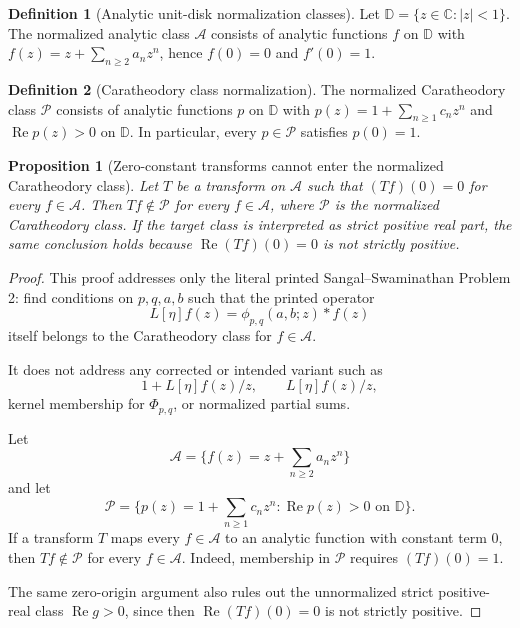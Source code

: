 \documentclass[11pt]{article}
\numberwithin{equation}{section}
\newtheorem{proposition}[theorem]{Proposition}
\theoremstyle{definition}
\newtheorem{definition}{Definition}[section]
\theoremstyle{remark}
\newcommand{\1}{\mathbf 1}
\begin{document}
\begin{definition}[Analytic unit-disk normalization classes]
\label{res:analytic-unit-disk-classes}
Let \(\mathbb D=\{z\in\mathbb C:|z|<1\}\). The normalized analytic class \(\mathcal A\) consists of analytic functions \(f\) on \(\mathbb D\) with \(f(z)=z+\sum_{n\ge2}a_nz^n\), hence \(f(0)=0\) and \(f'(0)=1\).
\end{definition}

\begin{definition}[Caratheodory class normalization]
\label{res:caratheodory-class-normalization}
The normalized Caratheodory class \(\mathcal P\) consists of analytic functions \(p\) on \(\mathbb D\) with \(p(z)=1+\sum_{n\ge1}c_nz^n\) and \(\operatorname{Re}p(z)>0\) on \(\mathbb D\). In particular, every \(p\in\mathcal P\) satisfies \(p(0)=1\).
\end{definition}

\begin{proposition}[Zero-constant transforms cannot enter the normalized Caratheodory class]
\label{res:zeroconstant-transform-not-caratheodory}
Let \(T\) be a transform on \(\mathcal A\) such that \((Tf)(0)=0\) for every \(f\in\mathcal A\). Then \(Tf\notin\mathcal P\) for every \(f\in\mathcal A\), where \(\mathcal P\) is the normalized Caratheodory class. If the target class is interpreted as strict positive real part, the same conclusion holds because \(\operatorname{Re}(Tf)(0)=0\) is not strictly positive.
\end{proposition}

\begin{proof}
This proof addresses only the literal printed Sangal--Swaminathan Problem 2:
find conditions on \(p,q,a,b\) such that the printed operator
\[
L[\eta]f(z)=\phi_{p,q}(a,b;z)*f(z)
\]
itself belongs to the Caratheodory class for \(f\in\mathcal A\).

It does not address any corrected or intended variant such as
\[
1+L[\eta]f(z)/z,\qquad L[\eta]f(z)/z,
\]
kernel membership for \(\Phi_{p,q}\), or normalized partial sums.

Let
\[
\mathcal A=\{f(z)=z+\sum_{n\ge 2}a_nz^n\}
\]
and let
\[
\mathcal P=\{p(z)=1+\sum_{n\ge 1}c_nz^n:\operatorname{Re}p(z)>0
\text{ on }\mathbb D\}.
\]
If a transform \(T\) maps every \(f\in\mathcal A\) to an analytic function
with constant term \(0\), then \(Tf\notin\mathcal P\) for every
\(f\in\mathcal A\). Indeed, membership in \(\mathcal P\) requires
\((Tf)(0)=1\).

The same zero-origin argument also rules out the unnormalized strict
positive-real class \(\operatorname{Re}g>0\), since then
\(\operatorname{Re}(Tf)(0)=0\) is not strictly positive.
\end{proof}
\end{document}
